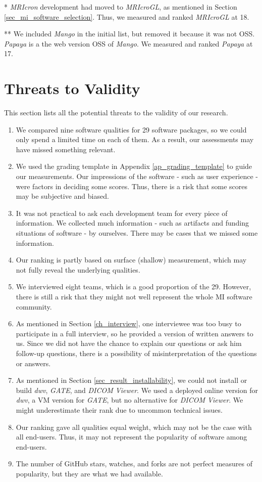 * \textit{MRIcron} development had moved to \textit{MRIcroGL}, as mentioned in Section \ref{sec_mi_software_selection}. Thus, we measured and ranked \textit{MRIcroGL} at 18.

** We included \textit{Mango} in the initial list, but removed it because it was not OSS. \textit{Papaya} is a the web version OSS of \textit{Mango}. We measured and ranked \textit{Papaya} at 17.

\section{Threats to Validity}
\label{sec_threats_to_validity}
This section lists all the potential threats to the validity of our research.



\begin{enumerate}
\item We compared nine software qualities for 29 software packages, so we could only spend a limited time on each of them. As a result, our assessments may have missed something relevant.
\item We used the grading template in Appendix \ref{ap_grading_template} to guide our measurements. Our impressions of the software - such as user experience - were factors in deciding some scores. Thus, there is a risk that some scores may be subjective and biased.
\item It was not practical to ask each development team for every piece of information. We collected much information - such as artifacts and funding situations of software - by ourselves. There may be cases that we missed some information.
\item Our ranking is partly based on surface (shallow) measurement, which may not fully reveal the underlying qualities.
\item We interviewed eight teams, which is a good proportion of the 29. However, there is still a risk that they might not well represent the whole MI software community.
\item As mentioned in Section \ref{ch_interview}, one interviewee was too busy to participate in a full interview, so he provided a version of written answers to us. Since we did not have the chance to explain our questions or ask him follow-up questions, there is a possibility of misinterpretation of the questions or answers.
\item As mentioned in Section \ref{sec_result_installability}, we could not install or build \textit{dwv}, \textit{GATE}, and \textit{DICOM Viewer}. We used a deployed online version for \textit{dwv}, a VM version for \textit{GATE}, but no alternative for \textit{DICOM Viewer}. We might underestimate their rank due to uncommon technical issues.
\item Our ranking gave all qualities equal weight, which may not be the case with all end-users. Thus, it may not represent the popularity of software among end-users.
\item The number of GitHub stars, watches, and forks are not perfect measures of popularity, but they are what we had available.
\end{enumerate}
